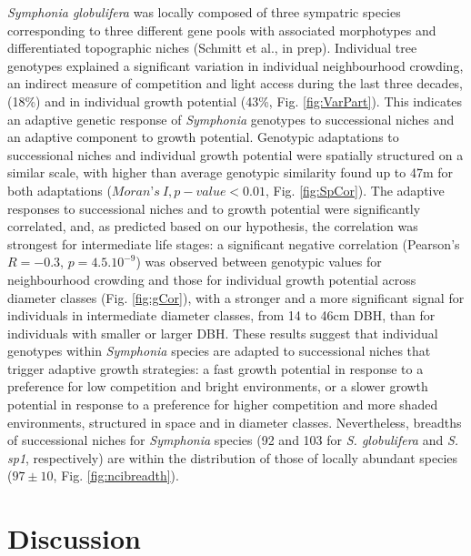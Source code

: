 \documentclass[
]{article}
\begin{document}
\emph{Symphonia globulifera} was locally composed of three sympatric species corresponding to three different gene pools with associated morphotypes and differentiated topographic niches (Schmitt et al., in prep).
Individual tree genotypes explained a significant variation in individual neighbourhood crowding, an indirect measure of competition and light access during the last three decades, (18\%)
and in individual growth potential (43\%, Fig. \ref{fig:VarPart}).
This indicates an adaptive genetic response of \emph{Symphonia} genotypes to successional niches and an adaptive component to growth potential.
Genotypic adaptations to successional niches and individual growth potential were spatially structured on a similar scale, with higher than average genotypic similarity found up to 47m for both adaptations (\(Moran’s~I, p-value<0.01\), Fig. \ref{fig:SpCor}).
The adaptive responses to successional niches and to growth potential were significantly correlated, and,
as predicted based on our hypothesis, the correlation was strongest for intermediate life stages:
a significant negative correlation (Pearson's \(R=-0.3\), \(p=4.5.10^{-9}\)) was observed between genotypic values for neighbourhood crowding and those for individual growth potential across diameter classes (Fig. \ref{fig:gCor}),
with a stronger and a more significant signal for individuals in intermediate diameter classes, from 14 to 46cm DBH, than for individuals with smaller or larger DBH.
These results suggest that individual genotypes within \emph{Symphonia} species are adapted to successional niches that trigger adaptive growth strategies:
a fast growth potential in response to a preference for low competition and bright environments,
or a slower growth potential in response to a preference for higher competition and more shaded environments,
structured in space and in diameter classes.
Nevertheless, breadths of successional niches for \emph{Symphonia} species (92 and 103 for \emph{S. globulifera} and \emph{S. sp1}, respectively)
are within the distribution of those of locally abundant species (\(97 \pm 10\), Fig. \ref{fig:ncibreadth}).

\hypertarget{discussion}{%
\section{Discussion}\label{discussion}}
\end{document}
